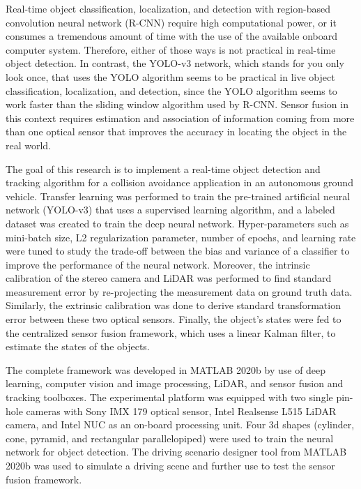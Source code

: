 
Real-time object classification, localization, and detection with region-based convolution neural network (R-CNN) require high computational power, or it consumes a tremendous amount of time with the use of the available onboard computer system. Therefore, either of those ways is not practical in real-time object detection. In contrast, the YOLO-v3 network, which stands for you only look once, that uses the YOLO algorithm seems to be practical in live object classification, localization, and detection, since the YOLO algorithm seems to work faster than the sliding window algorithm used by R-CNN. Sensor fusion in this context requires estimation and association of information coming from more than one optical sensor that improves the accuracy in locating the object in the real world. 

The goal of this research is to implement a real-time object detection and tracking algorithm for a collision avoidance application in an autonomous ground vehicle. Transfer learning was performed to train the pre-trained artificial neural network (YOLO-v3) that uses a supervised learning algorithm, and a labeled dataset was created to train the deep neural network. Hyper-parameters such as mini-batch size, L2 regularization parameter, number of epochs, and learning rate were tuned to study the trade-off between the bias and variance of a classifier to improve the performance of the neural network. Moreover, the intrinsic calibration of the stereo camera and LiDAR was performed to find standard measurement error by re-projecting the measurement data on ground truth data. Similarly, the extrinsic calibration was done to derive standard transformation error between these two optical sensors. Finally, the object's states were fed to the centralized sensor fusion framework, which uses a linear Kalman filter, to estimate the states of the objects. 

The complete framework was developed in MATLAB 2020b by use of deep learning, computer vision and image processing, LiDAR, and sensor fusion and tracking toolboxes. The experimental platform was equipped with two single pin-hole cameras with Sony IMX 179 optical sensor, Intel Realsense L515 LiDAR camera, and Intel NUC as an on-board processing unit. Four 3d shapes (cylinder, cone, pyramid, and rectangular parallelopiped) were used to train the neural network for object detection. The driving scenario designer tool from MATLAB 2020b was used to simulate a driving scene and further use to test the sensor fusion framework.   

